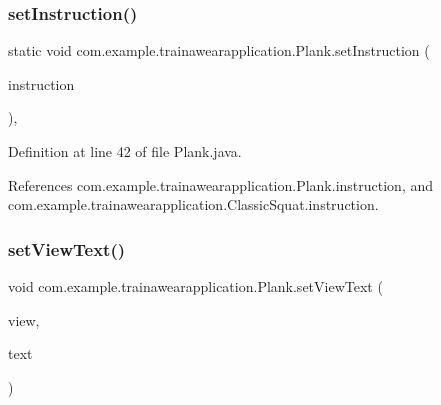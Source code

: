 \subsubsection{\texorpdfstring{setInstruction()}{setInstruction()}}
{\footnotesize\ttfamily static void com.\+example.\+trainawearapplication.\+Plank.\+set\+Instruction (\begin{DoxyParamCaption}\item[{int}]{instruction }\end{DoxyParamCaption})\hspace{0.3cm}{\ttfamily [inline]}, {\ttfamily [static]}}



Definition at line 42 of file Plank.\+java.


\begin{DoxyCode}{0}

\end{DoxyCode}


References com.\+example.\+trainawearapplication.\+Plank.\+instruction, and com.\+example.\+trainawearapplication.\+Classic\+Squat.\+instruction.

\mbox{\label{classcom_1_1example_1_1trainawearapplication_1_1_plank_a4d4a46b71ced8fe89023ccbf14d17f77}} 
\subsubsection{\texorpdfstring{setViewText()}{setViewText()}}
{\footnotesize\ttfamily void com.\+example.\+trainawearapplication.\+Plank.\+set\+View\+Text (\begin{DoxyParamCaption}\item[{Text\+View}]{view,  }\item[{String}]{text }\end{DoxyParamCaption})\hspace{0.3cm}{\ttfamily [inline]}}



